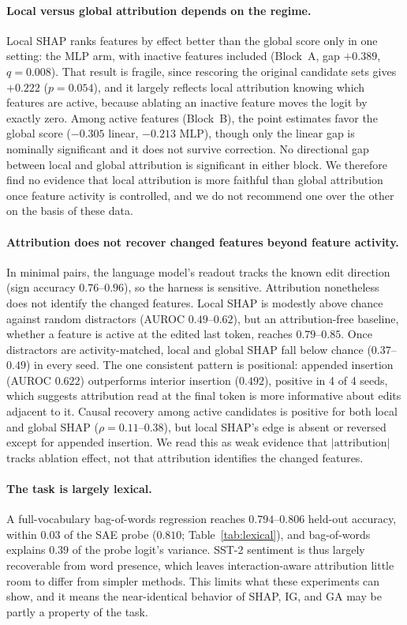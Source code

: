 \paragraph{Local versus global attribution depends on the regime.}
Local SHAP ranks features by effect better than the global score only in one setting: the MLP arm, with inactive features included (Block~A, gap $+0.389$, $q = 0.008$). That result is fragile, since rescoring the original candidate sets gives $+0.222$ ($p = 0.054$), and it largely reflects local attribution knowing which features are active, because ablating an inactive feature moves the logit by exactly zero. Among active features (Block~B), the point estimates favor the global score ($-0.305$ linear, $-0.213$ MLP), though only the linear gap is nominally significant and it does not survive correction. No directional gap between local and global attribution is significant in either block. We therefore find no evidence that local attribution is more faithful than global attribution once feature activity is controlled, and we do not recommend one over the other on the basis of these data.

\paragraph{Attribution does not recover changed features beyond feature activity.}
In minimal pairs, the language model's readout tracks the known edit direction (sign accuracy $0.76$--$0.96$), so the harness is sensitive. Attribution nonetheless does not identify the changed features. Local SHAP is modestly above chance against random distractors (AUROC $0.49$--$0.62$), but an attribution-free baseline, whether a feature is active at the edited last token, reaches $0.79$--$0.85$. Once distractors are activity-matched, local and global SHAP fall below chance ($0.37$--$0.49$) in every seed. The one consistent pattern is positional: appended insertion (AUROC $0.622$) outperforms interior insertion ($0.492$), positive in 4 of 4 seeds, which suggests attribution read at the final token is more informative about edits adjacent to it. Causal recovery among active candidates is positive for both local and global SHAP ($\rho = 0.11$--$0.38$), but local SHAP's edge is absent or reversed except for appended insertion. We read this as weak evidence that $|\text{attribution}|$ tracks ablation effect, not that attribution identifies the changed features.

\paragraph{The task is largely lexical.}
A full-vocabulary bag-of-words regression reaches $0.794$--$0.806$ held-out accuracy, within $0.03$ of the SAE probe ($0.810$; Table~\ref{tab:lexical}), and bag-of-words explains $0.39$ of the probe logit's variance. SST-2 sentiment is thus largely recoverable from word presence, which leaves interaction-aware attribution little room to differ from simpler methods. This limits what these experiments can show, and it means the near-identical behavior of SHAP, IG, and GA may be partly a property of the task.


